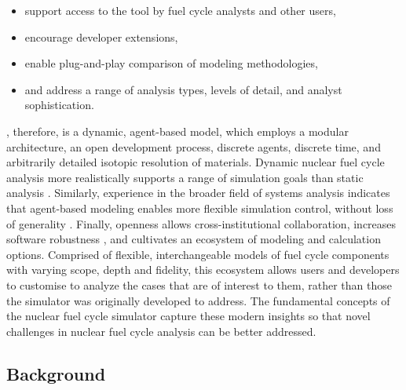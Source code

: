 \begin{itemize}
\item support access to the tool by fuel cycle analysts and other users,
\item encourage developer extensions,
\item enable plug-and-play comparison of modeling methodologies,
\item and address a range of analysis types, levels of detail, and analyst sophistication.
\end{itemize}

\Cyclus, therefore, is a dynamic, agent-based model, which employs a modular
architecture, an open development process, discrete agents, discrete time, and
arbitrarily detailed isotopic resolution of materials. Dynamic nuclear fuel
cycle analysis more realistically supports a range of simulation goals than
static analysis \cite{piet_dynamic_2011}. Similarly, experience in the broader
field of systems analysis indicates that agent-based modeling enables more
flexible simulation control, without loss of generality
\cite{macal_agent-based_2010}. Finally, openness allows cross-institutional
collaboration, increases software robustness \cite{cohen_modern_2010}, and
cultivates an ecosystem of modeling and calculation options. Comprised of
flexible, interchangeable models of fuel cycle components with varying scope,
depth and fidelity, this ecosystem allows users and developers to customise
\Cyclus to analyze the cases that are of interest to them, rather than those
the simulator was originally developed to address.  The fundamental concepts of
the \Cyclus nuclear fuel cycle simulator capture these modern insights so that
novel challenges in nuclear fuel cycle analysis can be better addressed.

\subsection{Background}



